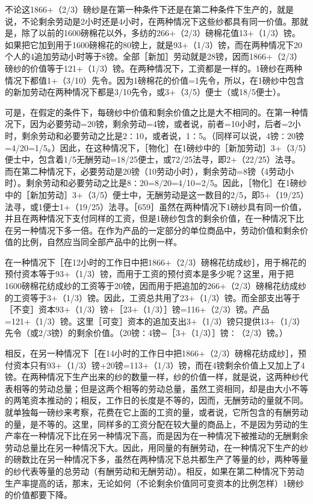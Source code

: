 不论这1866+（2/3）磅纱是在第一种条件下还是在第二种条件下生产的，就是说，不论剩余劳动是2小时还是4小时，在两种情况下这些纱都具有同一价值。那就是，除了以前的1600磅棉花以外，多纺的266+（2/3）磅棉花值13+（1/3）镑。如果把它加到用于1600磅棉花的80镑上，就是93+（1/3）镑，而在两种情况下20个人的4追加劳动小时等于8镑。全部［新加］劳动就是28镑，因而1866+（2/3）磅纱的价值等于121+（1/3）镑。在两种情况下，工资都是一样的。1磅纱在两种情况下都值1+（3/10）先令。因为1磅棉花的价值=1先令，所以，在1磅纱中包含的新加劳动在两种情况下都是3/10先令，或3+（3/5）便士（或18/5便士）。

可是，在假定的条件下，每磅纱中价值和剩余价值之比是大不相同的。在第一种情况下，因为必要劳动=20镑，剩余劳动=4镑，或者说，前者=10小时，后者=2小时，剩余劳动和必要劳动之比是2∶10，或者说，1∶5。（同样可以说，4镑∶20镑=4/20=1/5。）因此，在这种情况下，［物化］在1磅纱中的［新加劳动］3+（3/5）便士中，包含着1/5无酬劳动=18/25便士，或72/25法寻，即2+（22/25）法寻。而在第二种情况下，必要劳动是20镑（10劳动小时），剩余劳动=8镑（4劳动小时）。剩余劳动和必要劳动之比是8∶20=8/20=4/10=2/5。因此，［物化］在1磅纱中的［新加劳动］3+（3/5）便士中，无酬劳动是这一数目的2/5，即5+（19/25）法寻，或1便士1+（19/25）法寻。［659］虽然在两种情况下1磅纱具有同一价值，并且在两种情况下支付同样的工资，但是1磅纱包含的剩余价值，在一种情况下比在另一种情况下多一倍。在作为产品的一定部分的单位商品中，劳动价值和剩余价值的比例，自然应当同全部产品中的比例一样。

在一种情况下［在12小时的工作日中把1866+（2/3）磅棉花纺成纱］，用于棉花的预付资本等于93+（1/3）镑，而用于工资的预付资本是多少呢？这里，用于把1600磅棉花纺成纱的工资等于20镑，因而用于把追加的266+（2/3）磅棉花纺成纱的工资等于3+（1/3）镑。因此，工资总共用了23+（1/3）镑。而全部支出等于［不变］资本93+（1/3）镑+［23+（1/3）］镑=116+（2/3）镑。产品=121+（1/3）镑。这里［可变］资本的追加支出3+（1/3）镑只提供13+（1/3）先令（或2/3镑）的剩余价值。（20镑∶4镑=［3+（1/3）］镑∶（2/3）镑。）

相反，在另一种情况下［在14小时的工作日中把1866+（2/3）磅棉花纺成纱］，预付资本只有93+（1/3）镑+20镑=113+（1/3）镑，而在4镑剩余价值上又加上了4镑。在两种情况下生产出来的纱的数量一样，纱的价值一样，就是说，这两种纱代表相等的劳动总量；但是这两个相等的劳动总量，虽然工资相同，却是由大小不等的两笔资本推动的；相反，工作日的长度是不等的，因而，无酬劳动的量就不同。就单独每一磅纱来考察，花费在它上面的工资的量，或者说，它所包含的有酬劳动的量，是不等的。这里，同样多的工资分配在较大量的商品上，不是因为劳动的生产率在一种情况下比在另一种情况下高，而是因为在一种情况下被推动的无酬剩余劳动总量比在另一种情况下大。因此，用同量的有酬劳动，在一种情况下生产的纱的磅数比在另一种情况下多，虽然在两种情况下总共都生产了等量的纱，两种等量的纱代表等量的总劳动（有酬劳动和无酬劳动）。相反，如果在第二种情况下劳动生产率提高的话，那末，无论如何（不论剩余价值同可变资本的比例怎样）1磅纱的价值都要下降。

